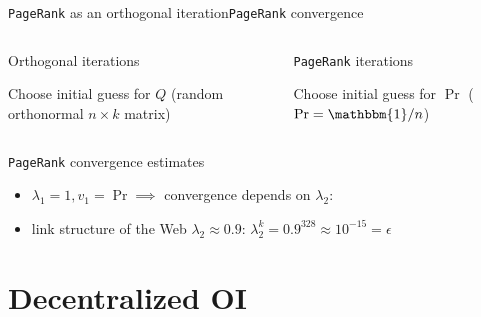 \documentclass[xcolor=table,final]{beamer} %
\newcommand{\PageRank}{\texttt{PageRank}\xspace}
\newcommand{\ones}{\mathbbm{1}}
\begin{document}
\begin{frame}{\PageRank as an orthogonal iteration}{\PageRank convergence}
  \begin{columns}
    \begin{block}{Orthogonal iterations}
      \begin{algorithm}[H]
        \BlankLine

        Choose initial guess for $Q$ {\small (random orthonormal $n \times k$ matrix)} \;

      \end{algorithm}
    \end{block}
    \begin{block}{\PageRank iterations}
      \begin{algorithm}[H]
        \KwResult{$\Pr$}
        \BlankLine

        Choose initial guess for $\Pr$ {\small ($\Pr = \ones/n$)} \;

      \end{algorithm}
    \end{block}
  \end{columns}

  \pause
  \begin{block}{\PageRank convergence estimates}
    \begin{itemize}\small
    \item $\lambda_1 = 1, v_1 = \Pr\implies$ convergence depends on $\lambda_2$: 
    \item link structure of the Web $\lambda_2 \approx 0.9$:
      $%
        {\lambda_2^k} = 0.9^{328} \approx 10^{-15} = {\epsilon}
      $%
    \end{itemize}
  \end{block}
\end{frame}
\section{Decentralized OI}
\end{document}
